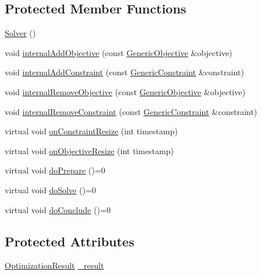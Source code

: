 \subsection*{Protected Member Functions}
\begin{DoxyCompactItemize}
\item 
\hyperlink{classocra_1_1Solver_aabd0d52a66f754de1c8f3958ba7faaca}{Solver} ()
\item 
void \hyperlink{classocra_1_1Solver_a451bb1506e4bb0423cddee847e4134e9}{internal\+Add\+Objective} (const \hyperlink{namespaceocra_a37a91885f4fa5c523d22cb15d5673062}{Generic\+Objective} \&objective)
\item 
void \hyperlink{classocra_1_1Solver_a18205ea34fae445bc22444655654552e}{internal\+Add\+Constraint} (const \hyperlink{namespaceocra_af10341108ce661566aad00908668e2b1}{Generic\+Constraint} \&constraint)
\item 
void \hyperlink{classocra_1_1Solver_a1acd7d8b110f30f06cb157f15faa8e31}{internal\+Remove\+Objective} (const \hyperlink{namespaceocra_a37a91885f4fa5c523d22cb15d5673062}{Generic\+Objective} \&objective)
\item 
void \hyperlink{classocra_1_1Solver_a9f8e8e482b24a6eb6e54e912335b1145}{internal\+Remove\+Constraint} (const \hyperlink{namespaceocra_af10341108ce661566aad00908668e2b1}{Generic\+Constraint} \&constraint)
\item 
virtual void \hyperlink{classocra_1_1Solver_ad74c2f36dcee107636675bb6ff16e26a}{on\+Constraint\+Resize} (int timestamp)
\item 
virtual void \hyperlink{classocra_1_1Solver_a7d45f67599edfa5ba8373b115378de5c}{on\+Objective\+Resize} (int timestamp)
\end{DoxyCompactItemize}
{\bf }\par
\begin{DoxyCompactItemize}
\item 
virtual void \hyperlink{classocra_1_1Solver_a9ab90e87025e3da7239141c48d28ab4a}{do\+Prepare} ()=0
\item 
virtual void \hyperlink{classocra_1_1Solver_ace2d7cfe741611de6dc87a0de7e7f3a9}{do\+Solve} ()=0
\item 
virtual void \hyperlink{classocra_1_1Solver_ac9d2d41d544b57a75e0d03db073d646e}{do\+Conclude} ()=0
\end{DoxyCompactItemize}

\subsection*{Protected Attributes}
\begin{DoxyCompactItemize}
\item 
\hyperlink{structocra_1_1OptimizationResult}{Optimization\+Result} \hyperlink{classocra_1_1Solver_abe284a585b558a2c11a8b99cb7a410da}{\+\_\+result}
\end{DoxyCompactItemize}
